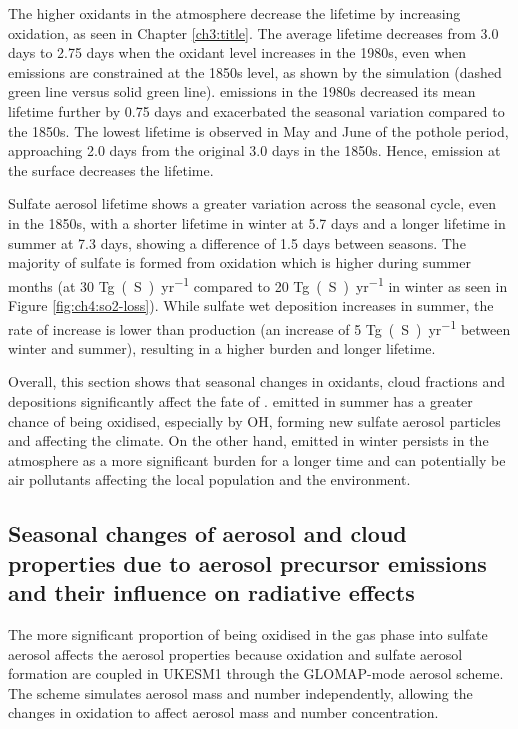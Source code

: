 The higher oxidants in the atmosphere decrease the  lifetime by increasing oxidation, as seen in Chapter \ref{ch3:title}. The average  lifetime decreases from 3.0 days to 2.75 days when the oxidant level increases in the 1980s, even when  emissions are constrained at the 1850s level, as shown by the \sstpiaer{} simulation (dashed green line versus solid green line).  emissions in the 1980s decreased its mean lifetime further by 0.75 days and exacerbated the seasonal variation compared to the 1850s. The lowest  lifetime is observed in May and June of the pothole period, approaching 2.0 days from the original 3.0 days in the 1850s. Hence,  emission at the surface decreases the lifetime. 

Sulfate aerosol lifetime shows a greater variation across the seasonal cycle, even in the 1850s, with a shorter lifetime in winter at 5.7 days and a longer lifetime in summer at 7.3 days, showing a difference of 1.5 days between seasons. The majority of sulfate is formed from  oxidation which is higher during summer months (at 30 \unit{Tg(S)~yr^{-1}} compared to 20 \unit{Tg(S)~yr^{-1}} in winter as seen in  Figure \ref{fig:ch4:so2-loss}). While sulfate wet deposition increases in summer, the rate of increase is lower than production (an increase of 5 \unit{Tg(S)~yr^{-1}} between winter and summer), resulting in a higher burden and longer lifetime. 

Overall, this section shows that seasonal changes in oxidants, cloud fractions and depositions significantly affect the fate of .  emitted in summer has a greater chance of being oxidised, especially by OH, forming new sulfate aerosol particles and affecting the climate. On the other hand,  emitted in winter persists in the atmosphere as a more significant burden for a longer time and can potentially be air pollutants affecting the local population and the environment. 

\subsection{Seasonal changes of aerosol and cloud properties due to aerosol precursor emissions and their influence on radiative effects}

The more significant proportion of  being oxidised in the gas phase into sulfate aerosol affects the aerosol properties because  oxidation and sulfate aerosol formation are coupled in UKESM1 through the GLOMAP-mode aerosol scheme. The scheme simulates aerosol mass and number independently, allowing the changes in oxidation to affect aerosol mass and number concentration. 

